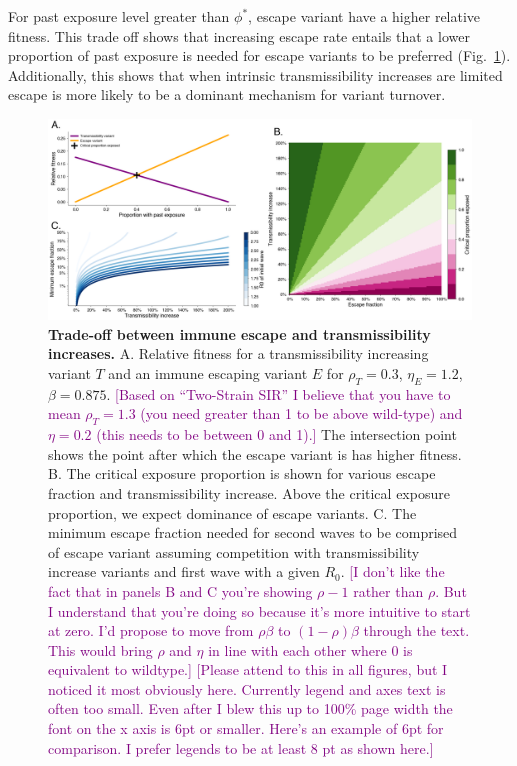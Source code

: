 \documentclass[11pt,oneside,letterpaper]{article}
\newcommand{\varEscape}{\eta}
\newcommand{\varTransmission}{\rho}
\def\tbc#1{\textcolor{purple}{[#1]}}
\begin{document}
For past exposure level greater than $\phi^{*}$, escape variant have a higher relative fitness.
This trade off shows that increasing escape rate entails that a lower proportion of past exposure is needed for escape variants to be preferred (Fig.~\ref{fig:transmission_tradeoff}).
Additionally, this shows that when intrinsic transmissibility increases are limited escape is more likely to be a dominant mechanism for variant turnover.

\begin{figure}[h]
    \centering
    \includegraphics[width=1.0\linewidth]{./figures/transmission_tradeoff.png}
    \caption{
      \textbf{Trade-off between immune escape and transmissibility increases.}
      A. Relative fitness for a transmissibility increasing variant $T$ and an immune escaping variant $E$ for $\varTransmission_T=0.3$, $\varEscape_E=1.2$, $\beta=0.875$.
      \tbc{Based on ``Two-Strain SIR'' I believe that you have to mean $\varTransmission_T=1.3$ (you need greater than 1 to be above wild-type) and $\varEscape=0.2$ (this needs to be between 0 and 1).}
      The intersection point shows the point after which the escape variant is has higher fitness.
      B. The critical exposure proportion is shown for various escape fraction and transmissibility increase. Above the critical exposure proportion, we expect dominance of escape variants.
      C. The minimum escape fraction needed for second waves to be comprised of escape variant assuming competition with transmissibility increase variants and first wave with a given $R_{0}$.
      \tbc{I don't like the fact that in panels B and C you're showing $\varTransmission-1$ rather than $\varTransmission$. But I understand that you're doing so because it's more intuitive to start at zero. I'd propose to move from $\varTransmission \beta$ to $(1-\varTransmission) \beta$ through the text. This would bring $\varTransmission$ and $\varEscape$ in line with each other where 0 is equivalent to wildtype.}
      \tbc{Please attend to this in all figures, but I noticed it most obviously here. Currently legend and axes text is often too small. Even after I blew this up to 100\% page width the font on the x axis is 6pt or smaller. \tiny{Here's an example of 6pt for comparison.} \footnotesize{I prefer legends to be at least 8 pt as shown here.}}
    }
    \label{fig:transmission_tradeoff}
\end{figure}
\end{document}

